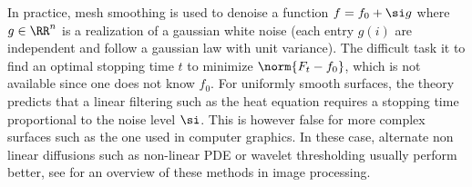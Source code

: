 In practice, mesh smoothing is used to denoise a function $f = f_0 + \si g$ where $g \in \RR^n$ is a realization of a gaussian white noise (each entry $g(i)$ are independent and follow a gaussian law with unit variance). The difficult task it to find an optimal stopping time $t$ to minimize $\norm{F_t-f_0}$, which is not available since one does not know $f_0$. For uniformly smooth surfaces, the theory predicts that a linear filtering such as the heat equation requires a stopping time proportional to the noise level $\si$. This is however false for more complex surfaces such as the one used in computer graphics. In these case, alternate non linear diffusions such as non-linear PDE or wavelet thresholding usually perform better, see \cite{mallat-book} for an overview of these methods in image processing. 

       
   


